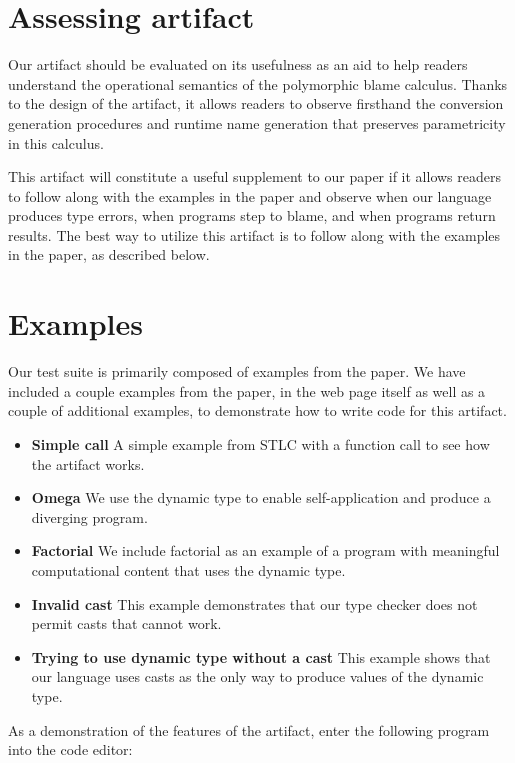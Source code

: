 \documentclass[11pt,numbers,nocopyrightspace,acmlarge,anonymous]{acmart}
\begin{document}
\section{Assessing artifact}

Our artifact should be evaluated on its usefulness
as an aid to help readers understand 
the operational semantics of the polymorphic blame calculus.
Thanks to the design of the artifact,
it allows readers to observe firsthand the
conversion generation procedures and 
runtime name generation that preserves parametricity in
this calculus.

This artifact will constitute a useful supplement
to our paper if it allows readers to follow along
with the examples in the paper and observe when
our language produces type errors,
when programs step to blame,
and when programs return results.
The best way to utilize this artifact is to
follow along with the examples in the paper,
as described below.

\section{Examples}

Our test suite is primarily composed of examples from
the paper. We have included a couple examples from the paper,
in the web page itself 
as well as a couple of additional examples,
to demonstrate how to write code for this artifact. 

\begin{itemize}
\item \textbf{Simple call} 
	A simple example from STLC with a function call
	to see how the artifact works.
\item \textbf{Omega} We use the dynamic type to 
	enable self-application and produce a diverging program.
\item \textbf{Factorial} We include factorial
	as an example of a program with meaningful computational
	content that uses the dynamic type.
\item \textbf{Invalid cast} This example demonstrates
	that our type checker does not permit casts
	that cannot work.
\item \textbf{Trying to use dynamic type without a cast}
	This example shows that our language uses casts
	as the only way to produce values of the dynamic type.
\end{itemize}

As a demonstration of the features of the artifact, enter the
following program into the code editor:
\end{document}
